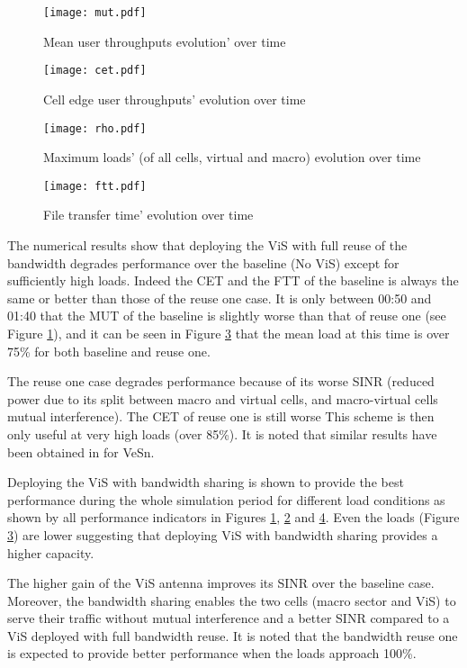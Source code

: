 \documentclass[conference]{IEEEtran}
\begin{document}
\begin{figure}[!ht]
\centering
\texttt{[image: mut.pdf]}
\caption{Mean user throughputs evolution' over time}
\label{fig:mut}
\end{figure}

\begin{figure}[!ht]
\centering
\texttt{[image: cet.pdf]}
\caption{Cell edge user throughputs' evolution over time}
\label{fig:cet}
\end{figure}

\begin{figure}[!ht]
\centering
\texttt{[image: rho.pdf]}
\caption{Maximum loads' (of all cells, virtual and macro) evolution over time}
\label{fig:rho}
\end{figure}

\begin{figure}[!ht]
\centering
\texttt{[image: ftt.pdf]}
\caption{File transfer time' evolution over time}
\label{fig:ftt}
\end{figure}

	The numerical results show that deploying the \ac{ViS} with full reuse of the bandwidth degrades performance over the baseline (No \ac{ViS}) except for sufficiently high loads. Indeed the \ac{CET} and the \ac{FTT} of the baseline is always the same or better than those of the reuse one case. It is only between 00:50 and 01:40 that the \ac{MUT} of the baseline is slightly worse than that of reuse one (see Figure \ref{fig:mut}), and it can be seen in Figure \ref{fig:rho} that the mean load at this time is over 75\% for both baseline and reuse one.

	The reuse one case degrades performance because of its worse \ac{SINR} (reduced power due to its split between macro and virtual cells, and macro-virtual cells mutual interference). The \ac{CET} of reuse one is still worse  This scheme is then only useful at very high loads (over 85\%). It is noted that similar results have been obtained in \cite{tall_selfoptimizingstrategies_2015} for \ac{VeSn}.

	Deploying the \ac{ViS} with bandwidth sharing is shown to provide the best performance during the whole simulation period for different load conditions as shown by all performance indicators in Figures \ref{fig:mut}, \ref{fig:cet} and \ref{fig:ftt}. Even the loads (Figure \ref{fig:rho}) are lower suggesting that deploying \ac{ViS} with bandwidth sharing provides a higher capacity.

	The higher gain of the \ac{ViS} antenna improves its \ac{SINR} over the baseline case. Moreover, the bandwidth sharing enables the two cells (macro sector and \ac{ViS}) to serve their traffic without mutual interference and a better \ac{SINR} compared to a \ac{ViS} deployed with full bandwidth reuse. It is noted that the bandwidth reuse one is expected to provide better performance when the loads approach 100\%.
\end{document}
